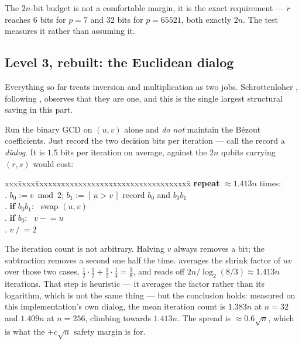 The $2n$-bit budget is not a comfortable margin, it is the exact requirement --- $r$ reaches $6$
bits for $p=7$ and $32$ bits for $p=65521$, both exactly $2n$. The test measures it rather than
assuming it.

\subsection{Level 3, rebuilt: the Euclidean dialog}\label{ec:sec:dialog}

Everything so far treats inversion and multiplication as two jobs. Schrottenloher
\cite{ec:schrott26}, following \cite{ec:khattar25}, observes that they are one, and this is the
single largest structural saving in this part.

Run the binary GCD on $(u,v)$ alone and \emph{do not} maintain the B\'ezout coefficients. Just
record the two decision bits per iteration --- call the record a \emph{dialog}. It is $1.5$ bits
per iteration on average, against the $2n$ qubits carrying $(r,s)$ would cost:

\begin{center}\small
\begin{minipage}{0.82\textwidth}
\begin{tabbing}
xxx\=xxxx\=xxxxxxxxxxxxxxxxxxxxxxxxxxxxxxxxxxxx\=\kill
\> \textbf{repeat} $\approx1.413n$ times:\\
.\> $b_0 := v \bmod 2$; \quad $b_1 := [\,u>v\,]$ \> record $b_0$ and $b_0b_1$\\
.\> \textbf{if} $b_0b_1$: \ swap $(u,v)$\\
.\> \textbf{if} $b_0$: \ $v \mathrel{-}= u$\\
.\> $v \mathrel{/}= 2$
\end{tabbing}
\end{minipage}
\end{center}

\noindent
The iteration count is not arbitrary. Halving $v$ always removes a bit; the subtraction removes a
second one half the time. \cite{ec:schrott26} averages the shrink factor of $uv$ over those two
cases, $\tfrac12\cdot\tfrac12+\tfrac12\cdot\tfrac14=\tfrac38$, and reads off
$2n/\log_2(8/3)\approx1.413n$ iterations. That step is heuristic --- it averages the factor rather
than its logarithm, which is not the same thing --- but the conclusion holds: measured on this
implementation's own dialog, the mean iteration count is $1.383n$ at $n=32$ and $1.409n$ at
$n=256$, climbing towards $1.413n$. The spread is $\approx0.6\sqrt n$, which is what the $+c\sqrt n$
safety margin is for.

